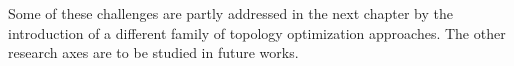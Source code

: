 Some of these challenges are partly addressed in the next chapter by the introduction of a different family of topology optimization approaches. The other research axes are to be studied in future works. 

